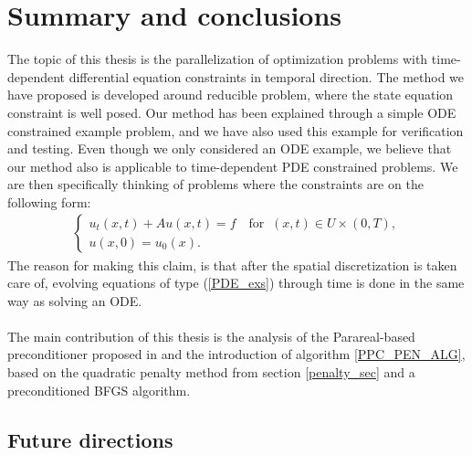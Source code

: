 \chapter{Summary and conclusions} \label{summary chap}
The topic of this thesis is the parallelization of optimization problems with time-dependent differential equation constraints in temporal direction. The method we have proposed is developed around reducible problem, where the state equation constraint is well posed. Our method has been explained through a simple ODE constrained example problem, and we have also used this example for verification and testing. Even though we only considered an ODE example, we believe that our method also is applicable to time-dependent PDE constrained problems. We are then specifically thinking of problems where the constraints are on the following form:
\begin{align}
\left\{
     \begin{array}{lr}
       	u_t(x,t) + Au(x,t)=f \quad \textrm{for } \ (x,t)\in U\times(0,T),\\
       	u(x,0)=u_0(x).
     \end{array}
   \right. \label{PDE_exs}
\end{align}
The reason for making this claim, is that after the spatial discretization is taken care of, evolving equations of type (\ref{PDE_exs}) through time is done in the same way as solving an ODE. 
\\
\\
The main contribution of this thesis is the analysis of the Parareal-based preconditioner proposed in \cite{maday2002parareal} and the introduction of algorithm \ref{PPC_PEN_ALG}, based on the quadratic penalty method from section \ref{penalty_sec} and a preconditioned BFGS algorithm. 
\section{Future directions}